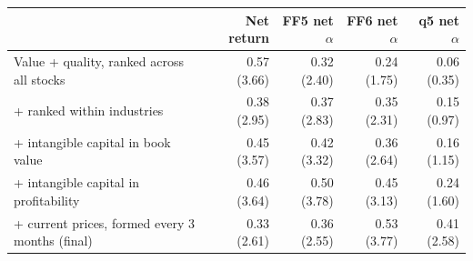 \begin{tabular}{lrrrr}
\toprule
 & Net return & FF5 net $\alpha$ & FF6 net $\alpha$ & q5 net $\alpha$ \\
\midrule
Value + quality, ranked across all stocks & 0.57 (3.66) & 0.32 (2.40) & 0.24 (1.75) & 0.06 (0.35) \\
+ ranked within industries & 0.38 (2.95) & 0.37 (2.83) & 0.35 (2.31) & 0.15 (0.97) \\
+ intangible capital in book value & 0.45 (3.57) & 0.42 (3.32) & 0.36 (2.64) & 0.16 (1.15) \\
+ intangible capital in profitability & 0.46 (3.64) & 0.50 (3.78) & 0.45 (3.13) & 0.24 (1.60) \\
+ current prices, formed every 3 months (final) & 0.33 (2.61) & 0.36 (2.55) & 0.53 (3.77) & 0.41 (2.58) \\
\bottomrule
\end{tabular}
